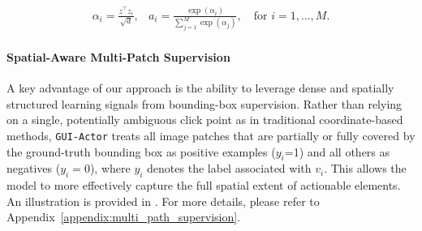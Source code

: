 \documentclass{article}
\newcommand{\sys}{\texttt{GUI-Actor}\xspace}
\begin{document}
\begin{equation}
\begin{array}{ll}
\displaystyle \alpha_i = \frac{z^\top z_i}{\sqrt{d}}, &
\displaystyle a_i = \frac{\exp(\alpha_i)}{\sum_{j=1}^M \exp(\alpha_j)}, \quad \text{for } i = 1, \dots, M.
\end{array}
\end{equation}

\paragraph{Spatial-Aware Multi-Patch Supervision}
A key advantage of our approach is the ability to leverage dense and spatially structured learning signals from bounding-box supervision. Rather than relying on a single, potentially ambiguous click point as in traditional coordinate-based methods, \sys treats all image patches that are partially or fully covered by the ground-truth bounding box as positive examples ($y_i$=1) and all others as negatives ($y_i=0$), where $y_i$ denotes the label associated with $v_i$. This allows the model to more effectively capture the full spatial extent of actionable elements. An illustration is provided in . For more details, please refer to Appendix~\ref{appendix:multi_path_supervision}.

\end{document}
